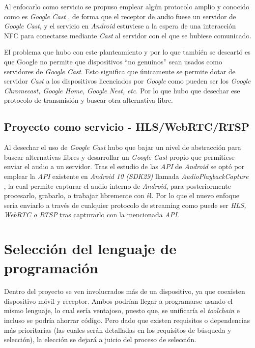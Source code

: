 Al enfocarlo como servicio se propuso emplear algún protocolo amplio y conocido
como es \emph{Google Cast} \cite{google-cast}, de forma que el receptor de audio
fuese un servidor de \emph{Google Cast}, y el servicio en \emph{Android}
estuviese a la espera de una interacción NFC para conectarse mediante
\emph{Cast} al servidor con el que se hubiese comunicado. 

El problema que hubo con este planteamiento y por lo que también se descartó es
que Google no permite que dispositivos ``no genuinos'' sean usados como
servidores de \emph{Google Cast}. Esto significa que únicamente se permite dotar
de servidor \emph{Cast} a los dispositivos licenciados por \emph{Google} como
pueden ser los \emph{Google Chromecast, Google Home, Google Nest, etc}. Por lo
que hubo que desechar ese protocolo de transmisión y buscar otra alternativa
libre.

\subsection{Proyecto como servicio - HLS/WebRTC/RTSP}

Al desechar el uso de \emph{Google Cast} hubo que bajar un nivel de abstracción
para buscar alternativas libres y desarrollar un \emph{Google Cast} propio que
permitiese enviar el audio a un servidor. Tras el estudio de las \emph{API} de
\emph{Android} se optó por emplear la \emph{API} existente en \emph{Android 10
(SDK29)} llamada \emph{AudioPlaybackCapture} \cite{api-audio-capture}, la cual
permite capturar el audio interno de \emph{Android}, para posteriormente
procesarlo, grabarlo, o trabajar libremente con él. Por lo que el nuevo enfoque
sería enviarlo a través de cualquier protocolo de streaming como puede ser \emph{HLS,
WebRTC o RTSP} tras capturarlo con la mencionada \emph{API}.


\section{Selección del lenguaje de programación}

Dentro del proyecto se ven involucrados más de un dispositivo, ya que coexisten
dispositivo móvil y receptor. Ambos podrían llegar a programarse usando el mismo
lenguaje, lo cual sería ventajoso, puesto que, se unificaría el \emph{toolchain} e
incluso se podría ahorrar código. Pero dado que existen requisitos o
dependencias más prioritarias (las cuales serán detalladas en los requisitos de
búsqueda y selección), la elección se dejará a juicio del proceso de selección.

